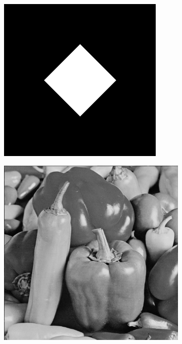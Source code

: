 \begin{figure}[htbp]
\begin{subfigure}[b]{0.2\textwidth}
    \includegraphics[width=\textwidth]{figs/method/fourier/square_45deg_original.png}
    \vspace*{0.02\textwidth}
  \end{subfigure}%
  \hspace*{0.02\textwidth}
  \begin{subfigure}[b]{0.2\textwidth}
    \centering
    \includegraphics[width=\textwidth]{figs/method/fourier/peppers_original.png}

\end{subfigure}
\end{figure}
